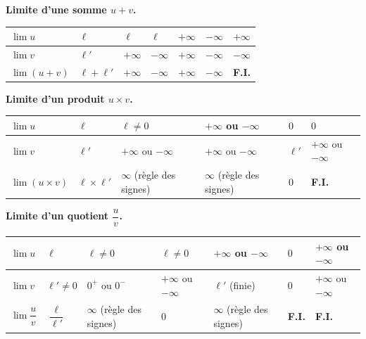 \documentclass[11pt]{article}
\begin{document}
\textbf{Limite d'une somme $u + v$.}\par
\begin{center}
\begin{tabularx}{\linewidth}{|l|>{\centering\arraybackslash}X|>{\centering\arraybackslash}X|>{\centering\arraybackslash}X|>{\centering\arraybackslash}X|>{\centering\arraybackslash}X|>{\centering\arraybackslash}X|}
\hline
\rowcolor{popblueL} $\lim u$ & $\ell$ & $\ell$ & $\ell$ & $+\infty$ & $-\infty$ & $+\infty$ \\
\hline
$\lim v$ & $\ell'$ & $+\infty$ & $-\infty$ & $+\infty$ & $-\infty$ & $-\infty$ \\
\hline
$\lim (u+v)$ & $\ell+\ell'$ & $+\infty$ & $-\infty$ & $+\infty$ & $-\infty$ & \textbf{F.I.} \\
\hline
\end{tabularx}
\end{center}

\textbf{Limite d'un produit $u \times v$.}\par
\begin{center}
\begin{tabularx}{\linewidth}{|l|>{\centering\arraybackslash}X|>{\centering\arraybackslash}X|>{\centering\arraybackslash}X|>{\centering\arraybackslash}X|>{\centering\arraybackslash}X|}
\hline
\rowcolor{popblueL} $\lim u$ & $\ell$ & $\ell \neq 0$ & $+\infty$ ou $-\infty$ & $0$ & $0$ \\
\hline
$\lim v$ & $\ell'$ & $+\infty$ ou $-\infty$ & $+\infty$ ou $-\infty$ & $\ell'$ & $+\infty$ ou $-\infty$ \\
\hline
$\lim (u \times v)$ & $\ell \times \ell'$ & $\infty$ (règle des signes) & $\infty$ (règle des signes) & $0$ & \textbf{F.I.} \\
\hline
\end{tabularx}
\end{center}

\textbf{Limite d'un quotient $\dfrac{u}{v}$.}\par
\begin{center}
\begin{tabularx}{\linewidth}{|l|>{\centering\arraybackslash}X|>{\centering\arraybackslash}X|>{\centering\arraybackslash}X|>{\centering\arraybackslash}X|>{\centering\arraybackslash}X|>{\centering\arraybackslash}X|}
\hline
\rowcolor{popblueL} $\lim u$ & $\ell$ & $\ell \neq 0$ & $\ell \neq 0$ & $+\infty$ ou $-\infty$ & $0$ & $+\infty$ ou $-\infty$ \\
\hline
$\lim v$ & $\ell' \neq 0$ & $0^+$ ou $0^-$ & $+\infty$ ou $-\infty$ & $\ell'$ (finie) & $0$ & $+\infty$ ou $-\infty$ \\
\hline
$\lim \dfrac{u}{v}$ & $\dfrac{\ell}{\ell'}$ & $\infty$ (règle des signes) & $0$ & $\infty$ (règle des signes) & \textbf{F.I.} & \textbf{F.I.} \\
\hline
\end{tabularx}
\end{center}
\end{document}
